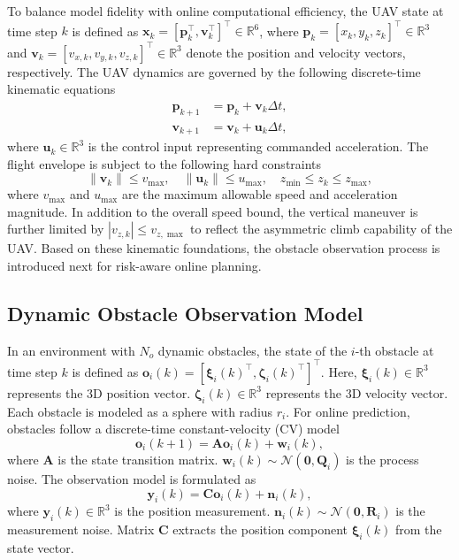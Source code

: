 \documentclass[lettersize,journal]{IEEEtran}
\newcommand{\vect}[1]{\boldsymbol{#1}}
\begin{document}
To balance model fidelity with online computational efficiency, the UAV state \cite{ref3} at time step $k$ is defined as $\vect{x}_k = [\vect{p}_k^\top, \vect{v}_k^\top]^\top \in \mathbb{R}^{6}$, where $\vect{p}_k = [x_k, y_k, z_k]^\top \in \mathbb{R}^3$ and $\vect{v}_k = [v_{x,k}, v_{y,k}, v_{z,k}]^\top \in \mathbb{R}^3$ denote the position and velocity vectors, respectively. The UAV dynamics are governed by the following discrete-time kinematic equations
\begin{align}
	\vect{p}_{k+1} &= \vect{p}_k + \vect{v}_k \Delta t, \label{eq:pk} \\
	\vect{v}_{k+1} &= \vect{v}_k + \vect{u}_k \Delta t, \label{eq:vk}
\end{align}
where $\vect{u}_k \in \mathbb{R}^{3}$ is the control input representing commanded acceleration. The flight envelope is subject to the following hard constraints
\begin{equation}
	\|\vect{v}_k\| \le v_{\max}, \quad \|\vect{u}_k\| \le u_{\max}, \quad z_{\min} \le z_k \le z_{\max},
	\label{eq:uav_constraints}
\end{equation}
where $v_{\max}$ and $u_{\max}$ are the maximum allowable speed and acceleration magnitude. In addition to the overall speed bound, the vertical maneuver is further limited by $|v_{z,k}| \le v_{z,\max}$ to reflect the asymmetric climb capability of the UAV. Based on these kinematic foundations, the obstacle observation process is introduced next for risk-aware online planning.

\subsection{Dynamic Obstacle Observation Model}

In an environment with $N_o$ dynamic obstacles, the state of the $i$-th obstacle at time step $k$ is defined as $\vect{o}_i(k) = [\vect{\xi}_i(k)^\top, \vect{\zeta}_i(k)^\top]^\top$. Here, $\vect{\xi}_i(k) \in \mathbb{R}^3$ represents the 3D position vector. $\vect{\zeta}_i(k) \in \mathbb{R}^3$ represents the 3D velocity vector. Each obstacle is modeled as a sphere with radius $r_i$. For online prediction, obstacles follow a discrete-time constant-velocity (CV) model \cite{ref9}
\begin{equation}
	\vect{o}_i(k+1) = \vect{A} \vect{o}_i(k) + \vect{w}_i(k),
	\label{eq:obs_dynamics}
\end{equation}
where $\vect{A}$ is the state transition matrix. $\vect{w}_i(k) \sim \mathcal{N}(\vect{0}, \vect{Q}_i)$ is the process noise. The observation model is formulated as
\begin{equation}
	\vect{y}_i(k) = \vect{C} \vect{o}_i(k) + \vect{n}_i(k),
	\label{eq:obs_measurement}
\end{equation}
where $\vect{y}_i(k) \in \mathbb{R}^3$ is the position measurement. $\vect{n}_i(k) \sim \mathcal{N}(\vect{0}, \vect{R}_i)$ is the measurement noise. Matrix $\vect{C}$ extracts the position component $\vect{\xi}_i(k)$ from the state vector. 
\end{document}

